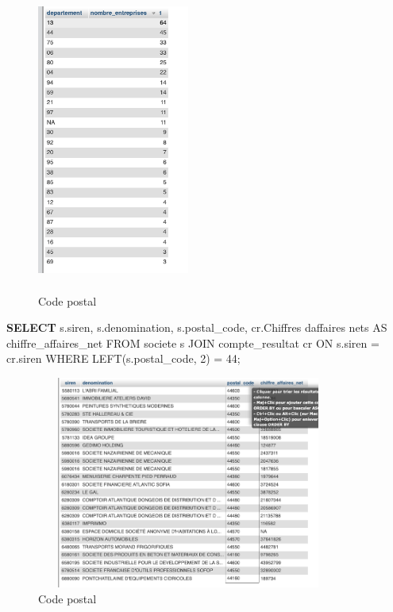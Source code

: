 \documentclass[mstat,12pt]{unswthesis}
\newenvironment{Shaded}{\begin{snugshade}}{\end{snugshade}}
\newcommand{\DecValTok}[1]{\textcolor[rgb]{0.00,0.00,0.81}{#1}}
\newcommand{\KeywordTok}[1]{\textcolor[rgb]{0.13,0.29,0.53}{\textbf{#1}}}
\newcommand{\NormalTok}[1]{#1}
\newcommand{\StringTok}[1]{\textcolor[rgb]{0.31,0.60,0.02}{#1}}
\begin{document}
\begin{figure}
\centering
\includegraphics[width=5cm,height=10cm]{image_sql/sql_1_Serdar.png}
\caption{Code postal}
\end{figure}

\newpage

\begin{Shaded}
\begin{Highlighting}[]
\KeywordTok{SELECT} 
\NormalTok{    s.siren,}
\NormalTok{    s.denomination,}
\NormalTok{    s.postal\_code,}
\NormalTok{    cr.\textasciigrave{}Chiffres d}\StringTok{\textquotesingle{}affaires nets\textasciigrave{} AS chiffre\_affaires\_net}
\StringTok{FROM }
\StringTok{    societe s}
\StringTok{JOIN }
\StringTok{    compte\_resultat cr ON s.siren = cr.siren}
\StringTok{WHERE }
\StringTok{    LEFT(s.postal\_code, 2) = \textquotesingle{}}\DecValTok{44}\StringTok{\textquotesingle{};}
\end{Highlighting}
\end{Shaded}

\begin{figure}
\centering
\includegraphics[width=10cm,height=7cm]{image_sql/sql_2_serdar.png}
\caption{Code postal}
\end{figure}
\end{document}
